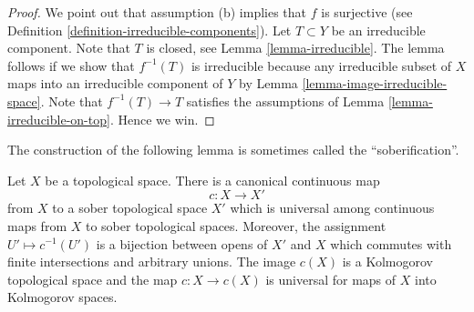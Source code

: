 \begin{proof}
We point out that assumption (b) implies that $f$ is surjective (see
Definition \ref{definition-irreducible-components}).
Let $T \subset Y$ be an irreducible component.
Note that $T$ is closed, see Lemma \ref{lemma-irreducible}.
The lemma follows if we show that $f^{-1}(T)$ is irreducible
because any irreducible subset of $X$ maps into an irreducible component
of $Y$ by Lemma \ref{lemma-image-irreducible-space}.
Note that $f^{-1}(T) \to T$ satisfies the assumptions
of Lemma \ref{lemma-irreducible-on-top}. Hence we win.
\end{proof}

\noindent
The construction of the following lemma is sometimes called
the ``soberification''.

\begin{lemma}
\label{lemma-make-sober}
\begin{reference}
\cite[Page 68 ff]{EGA1-second}
\end{reference}
Let $X$ be a topological space. There is a canonical continuous map
$$
c : X \longrightarrow X'
$$
from $X$ to a sober topological space $X'$ which is universal
among continuous maps from $X$ to sober topological spaces.
Moreover, the assignment $U' \mapsto c^{-1}(U')$ is a bijection
between opens of $X'$ and $X$ which commutes with finite intersections
and arbitrary unions.
The image $c(X)$ is a Kolmogorov topological space and the
map $c : X \to c(X)$ is universal for maps of $X$ into Kolmogorov spaces.
\end{lemma}

